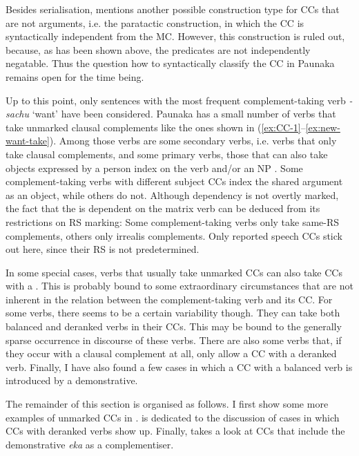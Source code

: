 
Besides serialisation, \citet[87]{Noonan2007} mentions another possible construction type for CCs that are not arguments, i.e. the paratactic construction, in which the CC is syntactically independent from the MC. However, this construction is ruled out, because, as has been shown above, the predicates are not independently negatable. Thus the question how to syntactically classify the CC in Paunaka remains open for the time being.

Up to this point, only sentences with the most frequent complement-taking verb \textit{-sachu} ‘want’ have been considered. Paunaka has a small number of verbs that take unmarked clausal complements like the ones shown in (\ref{ex:CC-1}–\ref{ex:new-want-take}). Among those verbs are some secondary verbs, i.e. verbs that only take clausal complements, and some primary verbs, those that can also take objects expressed by a person index on the verb and/or an NP \citep[cf.][9]{Dixon2006}. Some complement-taking verbs with different subject CCs index the shared argument as an object, while others do not. Although dependency is not overtly marked, the fact that the  is dependent on the matrix verb can be deduced from its restrictions on RS marking: Some complement-taking verbs only take same-RS complements, others only irrealis complements. Only reported speech CCs stick out here, since their RS is not predetermined.

In some special cases, verbs that usually take unmarked CCs can also take CCs with a . This is probably bound to some extraordinary circumstances that are not inherent in the relation between the complement-taking verb and its CC. For some verbs, there seems to be a certain variability though. They can take both balanced and deranked verbs in their CCs. This may be bound to the generally sparse occurrence in discourse of these verbs. There are also some verbs that, if they occur with a clausal complement at all, only allow a CC with a deranked verb. Finally, I have also found a few cases in which a CC with a balanced verb is introduced by a demonstrative.

The remainder of this section is organised as follows. I first show some more examples of unmarked CCs in .  is dedicated to the discussion of cases in which CCs with deranked verbs show up. Finally,  takes a look at CCs that include the demonstrative \textit{eka} as a complementiser.

